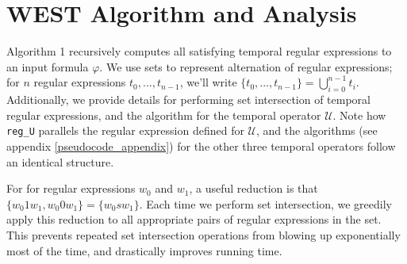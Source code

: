 \documentclass[runningheads]{llncs}
\renewcommand{\phi}{\varphi}
\begin{document}

\section{WEST Algorithm and Analysis} \label{WESTalg}
Algorithm 1 recursively computes all satisfying temporal regular expressions to an input formula $\phi$.
We use sets to represent alternation of regular expressions; for $n$ regular expressions $t_0, ..., t_{n-1}$, we'll write $\{t_0, ..., t_{n-1}\} = \bigcup_{i=0}^{n-1} t_i$. 
Additionally, we provide details for performing set intersection of temporal regular expressions, and the algorithm for the temporal operator $\mathcal{U}$.
Note how \texttt{reg\_U} parallels the regular expression defined for $\mathcal{U}$, and the algorithms (see appendix \ref{pseudocode_appendix}) for the other three temporal operators follow an identical structure. 

For for regular expressions $w_0$ and $w_1$, a useful reduction is that $\{w_0 1 w_1, w_0 0 w_1\} = \{w_0 s w_1\}$. Each time we perform set intersection, we greedily apply this reduction to all appropriate pairs of regular expressions in the set. This prevents repeated set intersection operations from blowing up exponentially most of the time, and drastically improves running time.



        
\end{document}
